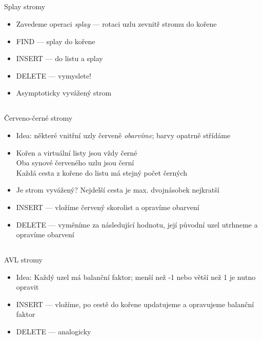 \documentclass{beamer}
\begin{document}
\subsection{}
\begin{frame}{Splay stromy}
\begin{itemize}
\item Zavedeme operaci {\em splay} --- rotaci uzlu zevnitř stromu do kořene
\item FIND --- splay do kořene
\item INSERT --- do listu a splay
\item DELETE --- vymyslete!
\item Asymptoticky vyvážený strom
\end{itemize}
\end{frame}

\subsection{}
\begin{frame}{Červeno-černé stromy}
\begin{itemize}
\item Idea: některé vnitřní uzly červeně {\em obarvíme}; barvy opatrně střídáme
\item Kořen a virtuální listy jsou vždy černé \\
	Oba synové červeného uzlu jsou černí \\
	Každá cesta z kořene do listu má stejný počet černých
\item Je strom vyvážený? \pause Nejdelší cesta je max. dvojnásobek nejkratší
\item INSERT --- vložíme červený skorolist a opravíme obarvení
\item DELETE --- vyměníme za následující hodnotu, její původní uzel utrhneme a opravíme obarvení
\end{itemize}
\end{frame}

\subsection{}
\begin{frame}{AVL stromy}
\begin{itemize}
\item Idea: Každý uzel má balanční faktor; menší než -1 nebo větší než 1 je nutno opravit
\item INSERT --- vložíme, po cestě do kořene updatujeme a opravujeme balanční faktor
\item DELETE --- analogicky
\end{itemize}
\end{frame}
\end{document}
